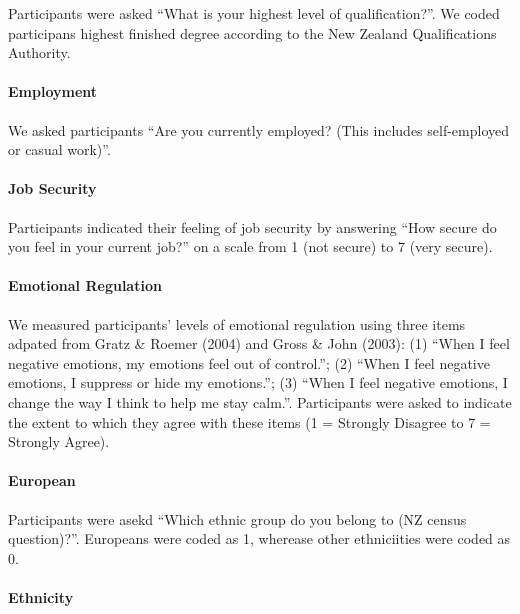 \documentclass[
  letterpaper,
  DIV=11,
  numbers=noendperiod]{scrartcl}
\let\oldparagraph\paragraph
\renewcommand{\paragraph}[1]{\oldparagraph{#1}\mbox{}}
\begin{document}
Participants were asked ``What is your highest level of
qualification?''. We coded participans highest finished degree according
to the New Zealand Qualifications Authority.

\hypertarget{employment}{%
\paragraph{Employment}\label{employment}}

We asked participants ``Are you currently employed? (This includes
self-employed or casual work)''.

\hypertarget{job-security}{%
\paragraph{Job Security}\label{job-security}}

Participants indicated their feeling of job security by answering ``How
secure do you feel in your current job?'' on a scale from 1 (not secure)
to 7 (very secure).

\hypertarget{emotional-regulation}{%
\paragraph{Emotional Regulation}\label{emotional-regulation}}

We measured participants' levels of emotional regulation using three
items adpated from Gratz \& Roemer (2004) and Gross \& John (2003): (1)
``When I feel negative emotions, my emotions feel out of control.''; (2)
``When I feel negative emotions, I suppress or hide my emotions.''; (3)
``When I feel negative emotions, I change the way I think to help me
stay calm.''. Participants were asked to indicate the extent to which
they agree with these items (1 = Strongly Disagree to 7 = Strongly
Agree).

\hypertarget{european}{%
\paragraph{European}\label{european}}

Participants were asekd ``Which ethnic group do you belong to (NZ census
question)?''. Europeans were coded as 1, wherease other ethniciities
were coded as 0.

\hypertarget{ethnicity}{%
\paragraph{Ethnicity}\label{ethnicity}}
\end{document}
